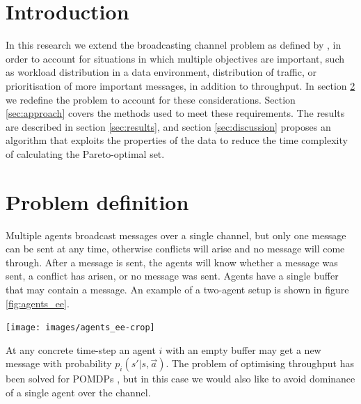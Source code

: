 \documentclass{article}
\makeatletter
\newenvironment{figurehere}
{\def\@captype{figure}}
{}
\makeatother
\begin{document}
	\begin{multicols}{2}

	\section{Introduction}
	\label{sec:introduction}
	In this research we extend the broadcasting channel problem as defined by
	\citet{ooi1996decentralized}, in order to account for situations in which
	multiple objectives are important, such as workload distribution in a data
	environment, distribution of traffic, or prioritisation of more important
	messages, in addition to throughput.
	In section \ref{sec:problem_definition} we redefine the problem to account
	for these considerations. Section \ref{sec:approach} covers the methods used
	to meet these requirements. The results are described in section
	\ref{sec:results}, and section \ref{sec:discussion} proposes an algorithm
	that exploits the properties of the data to reduce the time complexity of
	calculating the Pareto-optimal set.

	\section{Problem definition}
	\label{sec:problem_definition}
	Multiple agents broadcast messages over a single channel, but only one
	message can be sent at any time, otherwise conflicts will arise and no
	message will come through. After a message is sent, the agents will know
	whether a message was sent, a conflict has arisen, or no message was sent.
	Agents have a single buffer that may contain a message. An example of a
	two-agent setup is shown in figure \ref{fig:agents_ee}.

	\vspace{0.5cm}
	\begin{figurehere}
		\centering
		\texttt{[image: images/agents\_ee-crop]}
	   \label{fig:agents_ee}
	\end{figurehere}
	\vspace{0.5cm}

	At any concrete time-step an agent $i$ with an empty buffer may get a new
	message with probability $p_i(s' |s, \vec{a})$.
	The problem of optimising throughput has been solved for POMDPs
	\citep{ooi1996decentralized, hansen2004dynamic}, but in this case we would
	also like to avoid dominance of a single agent over the channel.


\end{multicols}
\end{document}
